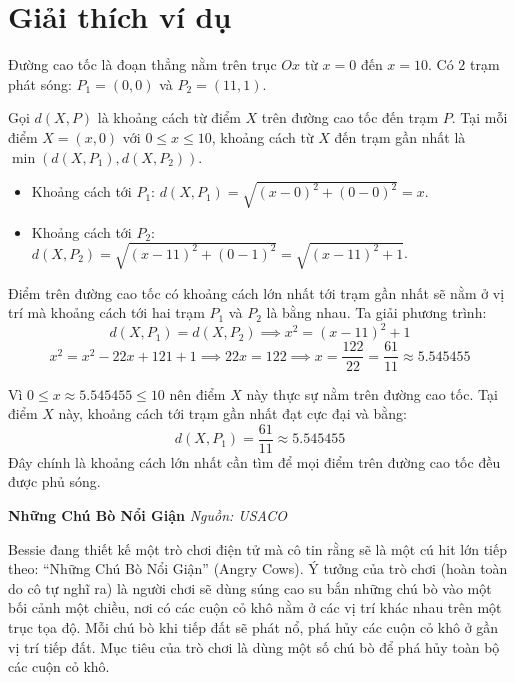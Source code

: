 \documentclass[12pt,a4paper]{article}
\newcommand{\problem}[2]{%
  \addcontentsline{toc}{section}{#1}%
  \begin{mdframed}[
    linecolor=framecolor,
    linewidth=1.5pt,
    backgroundcolor=white,
    topline=true, bottomline=true,
    leftline=true, rightline=true,
    innerleftmargin=10pt, innerrightmargin=10pt,
    innertopmargin=6pt, innerbottommargin=6pt,
  ]
  \textbf{\large #1} \hfill \textit{Nguồn: #2}
  \end{mdframed}
  \vspace{4pt}%
}
\begin{document}
\section*{Giải thích ví dụ}
Đường cao tốc là đoạn thẳng nằm trên trục $Ox$ từ $x = 0$ đến $x = 10$.
Có $2$ trạm phát sóng: $P_1 = (0, 0)$ và $P_2 = (11, 1)$.

Gọi $d(X, P)$ là khoảng cách từ điểm $X$ trên đường cao tốc đến trạm $P$.
Tại mỗi điểm $X = (x, 0)$ với $0 \le x \le 10$, khoảng cách từ $X$ đến trạm gần nhất là $\min(d(X, P_1), d(X, P_2))$.
\begin{itemize}
    \item Khoảng cách tới $P_1$: $d(X, P_1) = \sqrt{(x - 0)^2 + (0 - 0)^2} = x$.
    \item Khoảng cách tới $P_2$: $d(X, P_2) = \sqrt{(x - 11)^2 + (0 - 1)^2} = \sqrt{(x - 11)^2 + 1}$.
\end{itemize}

Điểm trên đường cao tốc có khoảng cách lớn nhất tới trạm gần nhất sẽ nằm ở vị trí mà khoảng cách tới hai trạm $P_1$ và $P_2$ là bằng nhau. Ta giải phương trình:
$$d(X, P_1) = d(X, P_2) \implies x^2 = (x - 11)^2 + 1$$
$$x^2 = x^2 - 22x + 121 + 1 \implies 22x = 122 \implies x = \frac{122}{22} = \frac{61}{11} \approx 5.545455$$

Vì $0 \le x \approx 5.545455 \le 10$ nên điểm $X$ này thực sự nằm trên đường cao tốc.
Tại điểm $X$ này, khoảng cách tới trạm gần nhất đạt cực đại và bằng:
$$d(X, P_1) = \frac{61}{11} \approx 5.545455$$
Đây chính là khoảng cách lớn nhất cần tìm để mọi điểm trên đường cao tốc đều được phủ sóng.


\newpage







\problem{Những Chú Bò Nổi Giận}{USACO}

Bessie đang thiết kế một trò chơi điện tử mà cô tin rằng sẽ là một cú hit lớn tiếp theo: ``Những Chú Bò Nổi Giận'' (Angry Cows). Ý tưởng của trò chơi (hoàn toàn do cô tự nghĩ ra) là người chơi sẽ dùng súng cao su bắn những chú bò vào một bối cảnh một chiều, nơi có các cuộn cỏ khô nằm ở các vị trí khác nhau trên một trục tọa độ. Mỗi chú bò khi tiếp đất sẽ phát nổ, phá hủy các cuộn cỏ khô ở gần vị trí tiếp đất. Mục tiêu của trò chơi là dùng một số chú bò để phá hủy toàn bộ các cuộn cỏ khô.
\end{document}
